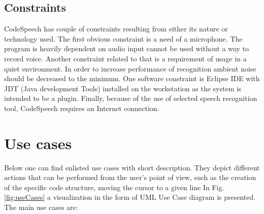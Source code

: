 \subsection{Constraints}
CodeSpeech has couple of constraints resulting from either its nature or technology used. The first obvious constraint is a need of a microphone. The program is heavily dependent on audio input cannot be used without a way to record voice. Another constraint related to that is a requirement of usage in a quiet environment. In order to increase performance of recognition ambient noise should be decreased to the minimum. One software constraint is Eclipse IDE with JDT (Java development Tools) installed on the workstation as the system is intended to be a plugin. Finally, because of the use of selected speech recognition tool, CodeSpeech requires an Internet connection.

\section{Use cases}

Below one can find enlisted use cases with short description. They depict different actions that can be performed from the user's point of view, such as the creation of the specific code structure, moving the cursor to a given line \etc In Fig. \ref{fig:useCases} a visualization in the form of UML Use Case diagram is presented. The main use cases are:


